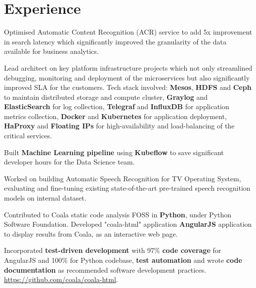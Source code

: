 \documentclass[]{deedy-resume-openfont}
\begin{document}
\hfill
\begin{minipage}[t]{0.66\textwidth} 


\section{Experience}
\vspace{\topsep} %
\begin{tightemize}
\item Optimised Automatic Content Recognition (ACR) service to add 5x improvement in search latency which significantly improved the granularity of the data available for business analytics.
\item Lead architect on key platform infrastructure projects which not only streamlined debugging, monitoring and deployment of the microservices but also significantly improved SLA for the customers. Tech stack involved: \textbf{Mesos}, \textbf{HDFS} and \textbf{Ceph} to maintain distributed storage and compute cluster, \textbf{Graylog} and \textbf{ElasticSearch} for log collection, \textbf{Telegraf} and \textbf{InfluxDB} for application metrics collection, \textbf{Docker} and \textbf{Kubernetes} for application deployment, \textbf{HaProxy} and \textbf{Floating IPs} for high-availability and load-balancing of the critical services.
\item Built \textbf{Machine Learning pipeline} using \textbf{Kubeflow} to save significant developer hours for the Data Science team.
\item Worked on building Automatic Speech Recognition for TV Operating System, evaluating and fine-tuning existing state-of-the-art pre-trained speech recognition models on internal dataset.
\end{tightemize}
\sectionsep

\begin{tightemize}     
\item Contributed to Coala \textemdash static code analysis FOSS \textemdash in \textbf{Python}, under Python Software Foundation. Developed "coala-html" application \textemdash \textbf{AngularJS} application to display results from Coala, as an interactive web page.
\item Incorporated \textbf{test-driven development} with 97\%    \textbf{code coverage} for AngularJS and 100\% for Python codebase, \textbf{test automation} and wrote \textbf{code documentation} as recommended software development practices. \href{https://github.com/coala/coala-html}{https://github.com/coala/coala-html}.
\end{tightemize}
\sectionsep


\end{minipage}
\end{document}
